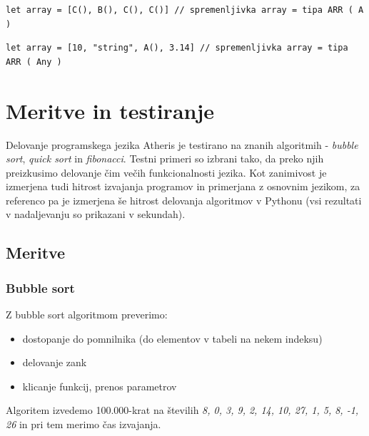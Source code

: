 \documentclass[a4paper, 12p]{book}
\begin{document}
\begin{lstlisting}[caption={Elementi tabele s skupnim nadrazredom.}, captionpos=b]
	let array = [C(), B(), C(), C()] // spremenljivka array = tipa ARR ( A )
\end{lstlisting}

\begin{lstlisting}[caption={Elementi tabele nimajo skupnega tipa.}, captionpos=b]
	let array = [10, "string", A(), 3.14] // spremenljivka array = tipa ARR ( Any )
\end{lstlisting}

\chapter{Meritve in testiranje}

Delovanje programskega jezika Atheris je testirano na znanih algoritmih - \textit{bubble sort}, \textit{quick sort} in \textit{fibonacci}. Testni primeri so izbrani tako, da preko njih preizkusimo delovanje čim večih funkcionalnosti jezika. Kot zanimivost je izmerjena tudi hitrost izvajanja programov in primerjana z osnovnim jezikom, za referenco pa je izmerjena še hitrost delovanja algoritmov v Pythonu (vsi rezultati v nadaljevanju so prikazani v sekundah).

\section{Meritve}

\subsection{Bubble sort}

Z bubble sort algoritmom preverimo:
\vspace{-7mm}
\begin{itemize}
	\setlength\itemsep{-1em}
	\item dostopanje do pomnilnika (do elementov v tabeli na nekem indeksu)
	\item delovanje zank
	\item klicanje funkcij, prenos parametrov
\end{itemize}
\vspace{-5mm}
Algoritem izvedemo 100.000-krat na številih \textit{8, 0, 3, 9, 2, 14, 10, 27, 1, 5, 8, -1, 26} in pri tem merimo čas izvajanja.

\end{document}
